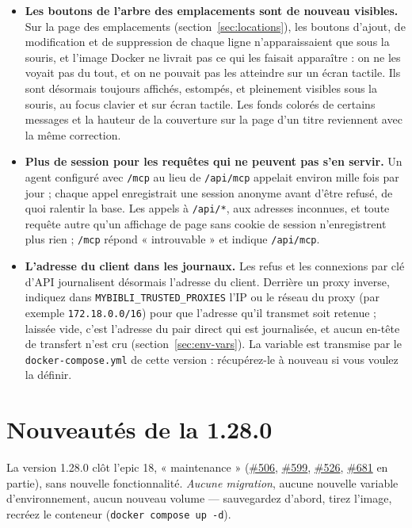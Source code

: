 \begin{itemize}
  \item \textbf{Les boutons de l'arbre des emplacements sont de nouveau
        visibles.} Sur la page des emplacements
        (section~\ref{sec:locations}), les boutons d'ajout, de
        modification et de suppression de chaque ligne n'apparaissaient
        que sous la souris, et l'image Docker ne livrait pas ce qui les
        faisait apparaître : on ne les voyait pas du tout, et on ne
        pouvait pas les atteindre sur un écran tactile. Ils sont
        désormais toujours affichés, estompés, et pleinement visibles
        sous la souris, au focus clavier et sur écran tactile. Les fonds
        colorés de certains messages et la hauteur de la couverture sur
        la page d'un titre reviennent avec la même correction.
  \item \textbf{Plus de session pour les requêtes qui ne peuvent pas
        s'en servir.} Un agent configuré avec \texttt{/mcp} au lieu de
        \texttt{/api/mcp} appelait environ mille fois par jour ; chaque
        appel enregistrait une session anonyme avant d'être refusé, de
        quoi ralentir la base. Les appels à \texttt{/api/*}, aux adresses
        inconnues, et toute requête autre qu'un affichage de page sans
        cookie de session n'enregistrent plus rien ; \texttt{/mcp}
        répond « introuvable » et indique \texttt{/api/mcp}.
  \item \textbf{L'adresse du client dans les journaux.} Les refus et les
        connexions par clé d'API journalisent désormais l'adresse du
        client. Derrière un proxy inverse, indiquez dans
        \texttt{MYBIBLI\_TRUSTED\_PROXIES} l'IP ou le réseau du proxy
        (par exemple \texttt{172.18.0.0/16}) pour que l'adresse qu'il
        transmet soit retenue ; laissée vide, c'est l'adresse du pair
        direct qui est journalisée, et aucun en-tête de transfert n'est
        cru (section~\ref{sec:env-vars}). La variable est transmise par
        le \texttt{docker-compose.yml} de cette version : récupérez-le à
        nouveau si vous voulez la définir.
\end{itemize}

\section{Nouveautés de la 1.28.0}\label{sec:whats-new-1.28.0}

La version 1.28.0 clôt l'epic 18, « maintenance »
(\href{https://github.com/guycorbaz/mybibli/issues/506}{\#506},
\href{https://github.com/guycorbaz/mybibli/issues/599}{\#599},
\href{https://github.com/guycorbaz/mybibli/issues/526}{\#526},
\href{https://github.com/guycorbaz/mybibli/issues/681}{\#681} en partie),
sans nouvelle fonctionnalité. \emph{Aucune migration}, aucune nouvelle
variable d'environnement, aucun nouveau volume --- sauvegardez d'abord,
tirez l'image, recréez le conteneur (\texttt{docker compose up -d}).

